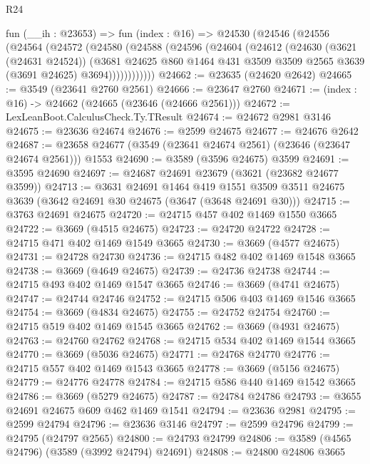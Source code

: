 \begin{lexlean}{R24}
\begin{coremodule}
    fun (__ih : @23653) =>
    fun (index : @16) =>
    @24530
      (@24546
        (@24556
          (@24564
            (@24572
              (@24580
                (@24588
                  (@24596
                    (@24604
                      (@24612
                        (@24630
                          (@3621 (@24631 @24524))
                          (@3681
                            @24625
                            @860
                            @1464
                            @431
                            @3509
                            @3509
                            @2565
                            @3639
                            (@3691 @24625)
                            @3694))))))))))))
@24662 := @23635 (@24620 @2642)
@24665 := @3549 (@23641 @2760 @2561)
@24666 := @23647 @2760
@24671 := (index : @16) -> @24662 (@24665 (@23646 (@24666 @2561)))
@24672 := LexLeanBoot.CalculusCheck.Ty.TResult
@24674 := @24672 @2981 @3146
@24675 := @23636 @24674
@24676 := @2599 @24675
@24677 := @24676 @2642
@24687 := @23658 @24677 (@3549 (@23641 @24674 @2561) (@23646 (@23647 @24674 @2561))) @1553
@24690 := @3589 (@3596 @24675) @3599
@24691 := @3595 @24690
@24697 := @24687 @24691 @23679 (@3621 (@23682 @24677 @3599))
@24713 := @3631
    @24691
    @1464
    @419
    @1551
    @3509
    @3511
    @24675
    @3639
    (@3642 @24691 @30 @24675 (@3647 (@3648 @24691 @30)))
@24715 := @3763 @24691 @24675
@24720 := @24715 @457 @402 @1469 @1550 @3665
@24722 := @3669 (@4515 @24675)
@24723 := @24720 @24722
@24728 := @24715 @471 @402 @1469 @1549 @3665
@24730 := @3669 (@4577 @24675)
@24731 := @24728 @24730
@24736 := @24715 @482 @402 @1469 @1548 @3665
@24738 := @3669 (@4649 @24675)
@24739 := @24736 @24738
@24744 := @24715 @493 @402 @1469 @1547 @3665
@24746 := @3669 (@4741 @24675)
@24747 := @24744 @24746
@24752 := @24715 @506 @403 @1469 @1546 @3665
@24754 := @3669 (@4834 @24675)
@24755 := @24752 @24754
@24760 := @24715 @519 @402 @1469 @1545 @3665
@24762 := @3669 (@4931 @24675)
@24763 := @24760 @24762
@24768 := @24715 @534 @402 @1469 @1544 @3665
@24770 := @3669 (@5036 @24675)
@24771 := @24768 @24770
@24776 := @24715 @557 @402 @1469 @1543 @3665
@24778 := @3669 (@5156 @24675)
@24779 := @24776 @24778
@24784 := @24715 @586 @440 @1469 @1542 @3665
@24786 := @3669 (@5279 @24675)
@24787 := @24784 @24786
@24793 := @3655 @24691 @24675 @609 @462 @1469 @1541
@24794 := @23636 @2981
@24795 := @2599 @24794
@24796 := @23636 @3146
@24797 := @2599 @24796
@24799 := @24795 (@24797 @2565)
@24800 := @24793 @24799
@24806 := @3589 (@4565 @24796) (@3589 (@3992 @24794) @24691)
@24808 := @24800 @24806 @3665

\end{coremodule}
\end{lexlean}
